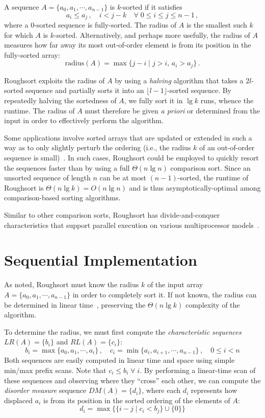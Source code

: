 \documentclass[letterpaper, 12pt]{article}
\let\supercite\cite
\renewcommand{\cite}[1]{\textnormal{~\supercite{#1}}}
\begin{document}
A sequence $A = \{a_0, a_1, \cdots, a_{n-1}\}$ is $k$-sorted if it satisfies
$$a_i \leq a_j \,,\quad i < j - k \quad\forall\; 0 \leq i \leq j \leq n-1\,,$$
where a 0-sorted sequence is fully-sorted.
The radius of $A$ is the smallest such $k$ for which $A$ is $k$-sorted.
Alternatively, and perhaps more usefully, the radius of $A$ measures how far away its most out-of-order element is from its
  position in the fully-sorted array:
$$\text{radius}(A) = \max\{j - i \mid j > i,\, a_i > a_j \} \,.$$

Roughsort exploits the radius of $A$ by using a \textit{halving} algorithm that takes a $2l$-sorted sequence and partially
  sorts it into an $\lfloor l - 1 \rfloor$-sorted sequence.
By repeatedly halving the sortedness of $A$, we fully sort it in $\lg k$ runs, whence the runtime.
The radius of $A$ must therefore be given \textit{a priori} or determined from the input
  in order to effectively perform the algorithm.

Some applications involve sorted arrays that are updated or extended in such a way as to only slightly perturb the ordering
  (i.e., the radius $k$ of an out-of-order sequence is small)\cite{altman89}.
In such cases, Roughsort could be employed to quickly resort the sequences faster than by using a full $\Theta(n \lg n)$
  comparison sort.
Since an unsorted sequence of length $n$ can be at most $(n - 1)$-sorted, the runtime of Roughsort is
  $\Theta(n \lg k) = O(n \lg n)$ and is thus asymptotically-optimal among comparison-based sorting algorithms.

Similar to other comparison sorts, Roughsort has divide-and-conquer characteristics that support parallel execution on various
  multiprocessor models\cite{altman89, altman90}.

\section{Sequential Implementation}
As noted, Roughsort must know the radius $k$ of the input array $A = \{a_0, a_1, \cdots, a_{n-1}\}$
  in order to completely sort it.
If not known, the radius can be determined in linear time\cite{altman89}, preserving the $\Theta(n \lg k)$ complexity of the
  algorithm.

To determine the radius, we must first compute the \textit{characteristic sequences} $LR(A) = \{b_i\}$ and $RL(A) = \{c_i\}$:
$$b_i = \max\{a_0, a_1, \cdots, a_i\}\,, \quad c_i = \min\{a_i, a_{i+1}, \cdots, a_{n-1}\}\,, \quad 0 \leq i < n$$
Both sequences are easily computed in linear time and space using simple min/max prefix scans.
Note that $c_i \leq b_i \;\forall\; i$.
By performing a linear-time scan of these sequences and observing where they ``cross'' each other, we can compute
  the \textit{disorder measure} sequence $DM(A) = \{d_i\}$, where each $d_i$ represents how displaced $a_i$ is from its position
  in the sorted ordering of the elements of $A$:
$$d_i = \max\big\{\{i - j \mid c_i < b_j\} \cup \{0\} \big\}$$
\end{document}
